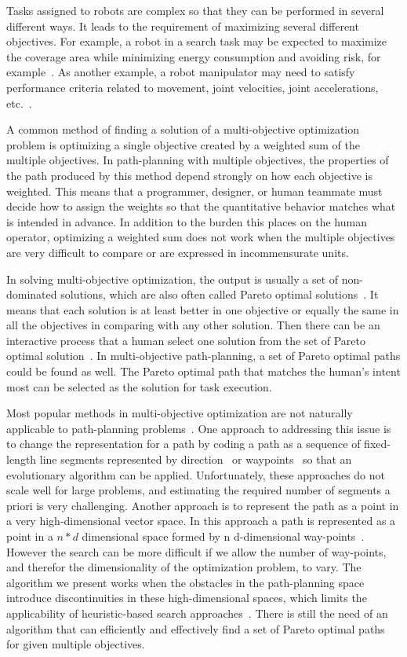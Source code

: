\documentclass[phd]{byuprop}
\begin{document}
Tasks assigned to robots are complex so that they can be performed in several different ways.
It leads to the requirement of maximizing several different objectives.
For example, a robot in a search task may be expected to maximize the coverage area while minimizing energy consumption and avoiding risk, for example~\cite{Mei2005,Yi2014}. 
As another example, a robot manipulator may need to satisfy performance criteria related to movement, joint velocities, joint accelerations, etc.~\cite{Pires2004}.

A common method of finding a solution of a multi-objective optimization problem is optimizing a single objective created by a weighted sum of the multiple objectives.  
In path-planning with multiple objectives, the properties of the path produced by this method depend strongly on how each objective is weighted. 
This means that a programmer, designer, or human teammate must decide how to assign the weights so that the quantitative behavior matches what is intended in advance.  
In addition to the burden this places on the human operator, optimizing a weighted sum does not work when the multiple objectives are very difficult to compare or are expressed in incommensurate units.

In solving multi-objective optimization, the output is usually a set of non-dominated solutions, which are also often called Pareto optimal solutions~\cite{Miettinen1999}.
It means that each solution is at least better in one objective or equally the same in all the objectives in comparing with any other solution.
Then there can be an interactive process that a human select one solution from the set of Pareto optimal solution~\cite{Marler2004}.
In multi-objective path-planning, a set of Pareto optimal paths could be found as well.
The Pareto optimal path that matches the human's intent most can be selected as the solution for task execution.

Most popular methods in multi-objective optimization are not naturally applicable to path-planning problems~\cite{Zhang2007,Deb2014}.
One approach to addressing this issue is to change the representation for a path by coding a path as a sequence of fixed-length line segments represented by direction~\cite{Ahmed2013,Howlett2006} or waypoints~\cite{Sujit2009,Pires2004} so that an evolutionary algorithm can be applied. 
Unfortunately, these approaches do not scale well for large problems, and estimating the required number of segments a priori is very challenging. 
Another approach is to represent the path as a point in a very high-dimensional vector space.
In this approach a path is represented as a point in a $ n * d $ dimensional space formed by n d-dimensional way-points~\cite{Ahmed2011,Ahmed2013}.
However the search can be more difficult if we allow the number of way-points, and therefor the dimensionality of the optimization problem, to vary. 
The algorithm we present works when the obstacles in the path-planning space introduce discontinuities in these high-dimensional spaces, which limits the applicability of heuristic-based search approaches~\cite{Sujit2009,Zhang2007}.
There is still the need of an algorithm that can efficiently and effectively find a set of Pareto optimal paths for given multiple objectives.
\end{document}
